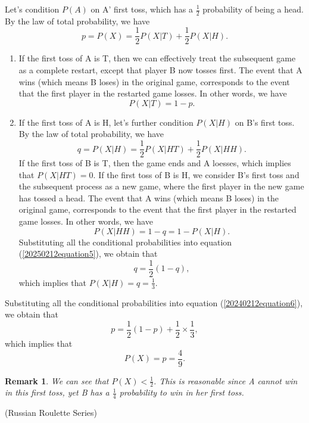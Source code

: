 \documentclass[12pt,letterpaper, onecolumn]{exam}
\newtheorem{remark}{Remark}
\begin{document}
\begin{questions}
\begin{solution}
    \quad Let's condition $P(A)$ on A' first toss, which has a $\frac{1}{2}$ probability of being a head. By the law of total probability, we have
    \begin{equation}\label{20240212equation6}
        p=P(X)=\frac{1}{2}P(X|T)+\frac{1}{2}P(X|H).  
    \end{equation}
    \begin{enumerate}
        \item If the first toss of A is T, then we can effectively treat the subsequent game as a complete restart, except that player B now tosses first. The event that A wins (which means B loses) in the original game, corresponds to the event that the first player in the restarted game losses. In other words, we have
        $$P(X|T)=1-p.$$
        \item If the first toss of A is H, let's further condition $P(X|H)$ on B's first toss. By the law of total probability, we have
        \begin{equation}\label{20250212equation5}
            q=P(X|H)=\frac{1}{2}P(X|HT)+\frac{1}{2}P(X|HH).
        \end{equation}
        If the first toss of B is T, then the game ends and A loesses, which implies that $P(X|HT)=0$. If the first toss of B is H, we consider B's first toss and the subsequent process as a new game, where the first player in the new game has tossed a head. The event that A wins (which means B loses) in the original game, corresponds to the event that the first player in the restarted game losses. In other words, we have
        $$P(X|HH)=1-q=1-P(X|H).$$
        Substituting all the conditional probabilities into equation (\ref{20250212equation5}), we obtain that
        $$q=\frac{1}{2}(1-q),$$
        which implies that $P(X|H)=q=\frac{1}{3}$.
    \end{enumerate}
    Substituting all the conditional probabilities into equation (\ref{20240212equation6}), we obtain that 
    $$p=\frac{1}{2}(1-p)+\frac{1}{2}\times\frac{1}{3},$$
    which implies that 
    $$P(X)=p=\frac{4}{9}.$$
\end{solution}
\begin{remark}
    We can see that $P(X)<\frac{1}{2}$. This is reasonable since A cannot win in this first toss, yet B has a $\frac{1}{4}$ probability to win in her first toss.
\end{remark}

\question[](Russian Roulette Series) 
\end{questions}
\end{document}
